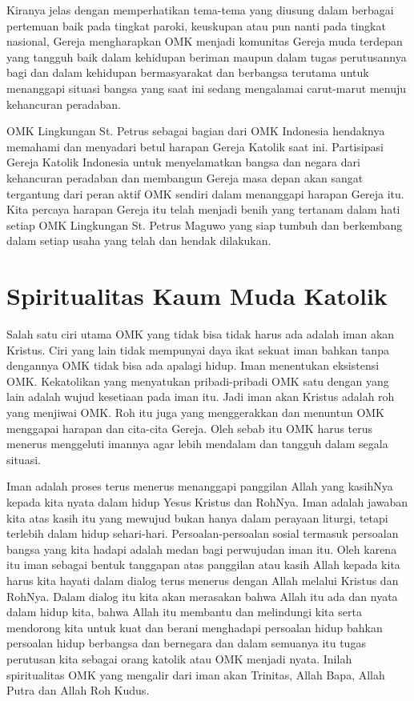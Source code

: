         Kiranya jelas dengan memperhatikan tema-tema yang diusung dalam berbagai pertemuan baik pada tingkat paroki, keuskupan atau pun nanti pada tingkat nasional,  Gereja mengharapkan OMK menjadi komunitas Gereja muda terdepan yang tangguh baik dalam kehidupan beriman maupun dalam tugas perutusannya bagi dan dalam kehidupan bermasyarakat dan berbangsa terutama untuk menanggapi situasi bangsa yang saat ini sedang mengalamai carut-marut menuju kehancuran peradaban.
 
       OMK Lingkungan St. Petrus sebagai bagian dari OMK Indonesia hendaknya memahami dan menyadari betul  harapan Gereja Katolik saat ini. Partisipasi Gereja Katolik Indonesia untuk menyelamatkan bangsa dan negara dari kehancuran peradaban dan membangun Gereja masa depan akan sangat tergantung dari peran aktif OMK sendiri dalam menanggapi harapan Gereja itu. Kita percaya harapan Gereja itu telah menjadi benih yang tertanam dalam hati setiap OMK Lingkungan St. Petrus Maguwo yang siap tumbuh dan berkembang dalam setiap usaha yang telah dan hendak dilakukan.
 
\section*{Spiritualitas Kaum Muda Katolik}
 
      Salah satu ciri utama OMK yang tidak bisa tidak harus ada adalah iman akan Kristus. Ciri yang lain tidak mempunyai daya ikat sekuat iman bahkan tanpa dengannya OMK tidak bisa ada apalagi hidup. Iman menentukan eksistensi OMK. Kekatolikan yang menyatukan pribadi-pribadi OMK satu dengan yang lain adalah wujud kesetiaan pada iman itu. Jadi iman akan Kristus adalah roh yang menjiwai OMK. Roh itu juga yang menggerakkan dan menuntun OMK menggapai harapan dan cita-cita Gereja. Oleh sebab itu OMK harus terus menerus menggeluti imannya agar lebih mendalam dan tangguh dalam segala situasi.
 
       Iman adalah proses terus menerus menanggapi panggilan Allah yang  kasihNya kepada kita nyata dalam hidup Yesus Kristus dan RohNya. Iman adalah jawaban kita atas kasih itu yang mewujud bukan hanya dalam perayaan liturgi, tetapi terlebih dalam hidup sehari-hari. Persoalan-persoalan sosial termasuk persoalan bangsa yang kita hadapi adalah medan bagi perwujudan iman itu. Oleh karena itu iman sebagai bentuk tanggapan atas panggilan atau kasih Allah kepada kita harus kita hayati dalam dialog terus menerus dengan Allah melalui Kristus dan RohNya. Dalam dialog itu kita akan merasakan bahwa Allah itu ada dan nyata dalam hidup kita, bahwa Allah itu membantu dan melindungi kita serta mendorong kita untuk kuat dan berani menghadapi persoalan hidup bahkan persoalan hidup berbangsa dan bernegara dan dalam semuanya itu tugas perutusan kita sebagai orang katolik atau OMK  menjadi nyata. Inilah spiritualitas OMK yang mengalir dari iman akan Trinitas, Allah Bapa, Allah Putra dan Allah Roh Kudus.
     
